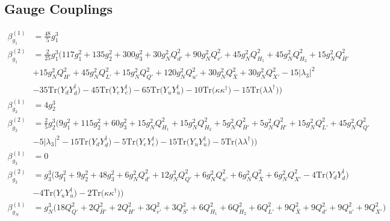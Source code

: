 \subsection{Gauge Couplings}
{\allowdisplaybreaks  \begin{align} 
\beta_{g_1}^{(1)} & =  
\frac{48}{5} g_{1}^{3} \\ 
\beta_{g_1}^{(2)} & =  
\frac{2}{25} g_{1}^{3} \Big(117 g_{1}^{2} +135 g_{2}^{2} +300 g_{3}^{2} +30 g_{N}^{2} Q_{d'}^{2} +90 g_{N}^{2} Q_{e'}^{2} +45 g_{N}^{2} Q_{H_1}^{2} +45 g_{N}^{2} Q_{H_2}^{2} +15 g_{N}^{2} Q_{\bar{H}'}^{2} \nonumber \\ 
 &+15 g_{N}^{2} Q_{H'}^{2} +45 g_{N}^{2} Q_{L'}^{2} +15 g_{N}^{2} Q_{Q'}^{2} +120 g_{N}^{2} Q_{u'}^{2} +30 g_{N}^{2} Q_{\bar{X}}^{2} +30 g_{N}^{2} Q_{X'}^{2} -15 |\lambda_3|^2 \nonumber \\ 
 &-35 \mbox{Tr}\Big({Y_d  Y_{d}^{\dagger}}\Big) -45 \mbox{Tr}\Big({Y_e  Y_{e}^{\dagger}}\Big) -65 \mbox{Tr}\Big({Y_u  Y_{u}^{\dagger}}\Big) -10 \mbox{Tr}\Big({\kappa  \kappa^{\dagger}}\Big) -15 \mbox{Tr}\Big({\lambda  \lambda^{\dagger}}\Big) \Big)\\ 
\beta_{g_2}^{(1)} & =  
4 g_{2}^{3} \\ 
\beta_{g_2}^{(2)} & =  
\frac{2}{5} g_{2}^{3} \Big(9 g_{1}^{2} +115 g_{2}^{2} +60 g_{3}^{2} +15 g_{N}^{2} Q_{H_1}^{2} +15 g_{N}^{2} Q_{H_2}^{2} +5 g_{N}^{2} Q_{\bar{H}'}^{2} +5 g_{N}^{2} Q_{H'}^{2} +15 g_{N}^{2} Q_{L'}^{2} +45 g_{N}^{2} Q_{Q'}^{2} \nonumber \\ 
 &-5 |\lambda_3|^2 -15 \mbox{Tr}\Big({Y_d  Y_{d}^{\dagger}}\Big) -5 \mbox{Tr}\Big({Y_e  Y_{e}^{\dagger}}\Big) -15 \mbox{Tr}\Big({Y_u  Y_{u}^{\dagger}}\Big) -5 \mbox{Tr}\Big({\lambda  \lambda^{\dagger}}\Big) \Big)\\ 
\beta_{g_3}^{(1)} & =  
0\\ 
\beta_{g_3}^{(2)} & =  
g_{3}^{3} \Big(3 g_{1}^{2} +9 g_{2}^{2} +48 g_{3}^{2} +6 g_{N}^{2} Q_{d'}^{2} +12 g_{N}^{2} Q_{Q'}^{2} +6 g_{N}^{2} Q_{u'}^{2} +6 g_{N}^{2} Q_{\bar{X}}^{2} +6 g_{N}^{2} Q_{X'}^{2} -4 \mbox{Tr}\Big({Y_d  Y_{d}^{\dagger}}\Big) \nonumber \\ 
 &-4 \mbox{Tr}\Big({Y_u  Y_{u}^{\dagger}}\Big) -2 \mbox{Tr}\Big({\kappa  \kappa^{\dagger}}\Big) \Big)\\ 
\beta_{g_N}^{(1)} & =  
g_{N}^{3} \Big(18 Q_{Q'}^{2}  + 2 Q_{\bar{H}'}^{2}  + 2 Q_{H'}^{2}  + 3 Q_{e'}^{2}  + 3 Q_{S'}^{2}  + 6 Q_{H_1}^{2}  + 6 Q_{H_2}^{2}  + 6 Q_{L'}^{2}  + 9 Q_{\bar{X}}^{2}  + 9 Q_{d'}^{2}  + 9 Q_{u'}^{2}  + 9 Q_{X'}^{2} \Big)\\ 

\end{align}}
